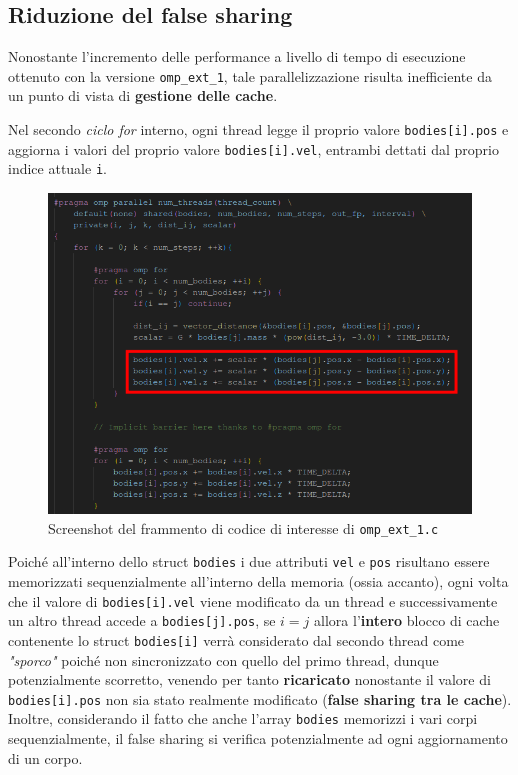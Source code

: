 \documentclass[12pt]{report}
\begin{document}
    \newpage

    \subsection{Riduzione del false sharing}

    Nonostante l'incremento delle performance a livello di tempo di esecuzione ottenuto con la versione \texttt{omp\_ext\_1}, tale parallelizzazione risulta inefficiente da un punto di vista di \textbf{gestione delle cache}.
    
    Nel secondo \textit{ciclo for} interno, ogni thread legge il proprio valore \texttt{bodies[i].pos} e aggiorna i valori del proprio valore \texttt{bodies[i].vel}, entrambi dettati dal proprio indice attuale \texttt{i}.

    \begin{figure}[H]
        \centering
        \includegraphics[width=\textwidth]{images/omp_ext_1_false_sharing.png}
        \caption{Screenshot del frammento di codice di interesse di \texttt{omp\_ext\_1.c}}
        \label{fig:omp_ext_1_false_sharing}
    \end{figure}

    Poiché all'interno dello struct \texttt{bodies} i due attributi \texttt{vel} e \texttt{pos} risultano essere memorizzati sequenzialmente all'interno della memoria (ossia accanto), ogni volta che il valore di \texttt{bodies[i].vel} viene modificato da un thread e successivamente un altro thread accede a \texttt{bodies[j].pos}, se $i = j$ allora l'\textbf{intero} blocco di cache contenente lo struct \texttt{bodies[i]} verrà considerato dal secondo thread come \textit{"sporco"} poiché non sincronizzato con quello del primo thread, dunque potenzialmente scorretto, venendo per tanto \textbf{ricaricato} nonostante il valore di \texttt{bodies[i].pos} non sia stato realmente modificato (\textbf{false sharing tra le cache}). Inoltre, considerando il fatto che anche l'array \texttt{bodies} memorizzi i vari corpi sequenzialmente, il false sharing si verifica potenzialmente ad ogni aggiornamento di un corpo.
    
\end{document}
